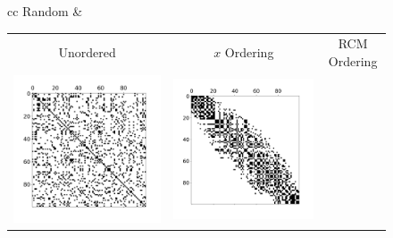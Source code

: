 \documentclass[12pt]{article}
\begin{document}
\newcommand{\figordersize}{.25}
\begin{figure}[h]
	\centering
	\begin{tabular}{cc}
		Random & \begin{tabular}{ccc}
			Unordered & $x$ Ordering & RCM Ordering \\
			\includegraphics[width=\figordersize\textwidth]{spy_random_unordered.png} &
			\includegraphics[width=\figordersize\textwidth]{spy_random_xorder.png} &

\end{tabular}
\end{tabular}
\end{figure}
\end{document}
